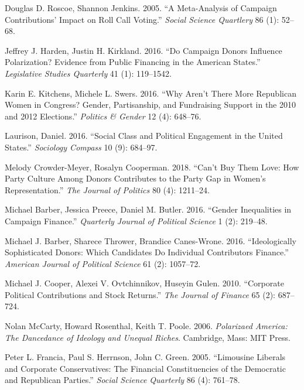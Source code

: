 \documentclass[11pt,]{article}
\begin{document}
\leavevmode\hypertarget{ref-roscoe2005}{}%
Douglas D. Roscoe, Shannon Jenkins. 2005. ``A Meta-Analysis of Campaign
Contributions' Impact on Roll Call Voting.'' \emph{Social Science
Quartlery} 86 (1): 52--68.

\leavevmode\hypertarget{ref-harden2016}{}%
Jeffrey J. Harden, Justin H. Kirkland. 2016. ``Do Campaign Donors
Influence Polarization? Evidence from Public Financing in the American
States.'' \emph{Legislative Studies Quarterly} 41 (1): 119--1542.

\leavevmode\hypertarget{ref-kitchens2016}{}%
Karin E. Kitchens, Michele L. Swers. 2016. ``Why Aren't There More
Republican Women in Congress? Gender, Partisanship, and Fundraising
Support in the 2010 and 2012 Elections.'' \emph{Politics \& Gender} 12
(4): 648--76.

\leavevmode\hypertarget{ref-laurison2016}{}%
Laurison, Daniel. 2016. ``Social Class and Political Engagement in the
United States.'' \emph{Sociology Compass} 10 (9): 684--97.

\leavevmode\hypertarget{ref-crowder-meyer2018}{}%
Melody Crowder-Meyer, Rosalyn Cooperman. 2018. ``Can't Buy Them Love:
How Party Culture Among Donors Contributes to the Party Gap in Women's
Representation.'' \emph{The Journal of Politics} 80 (4): 1211--24.

\leavevmode\hypertarget{ref-barber2016b}{}%
Michael Barber, Jessica Preece, Daniel M. Butler. 2016. ``Gender
Inequalities in Campaign Finance.'' \emph{Quarterly Journal of Political
Science} 1 (2): 219--48.

\leavevmode\hypertarget{ref-barber2016c}{}%
Michael J. Barber, Sharece Thrower, Brandice Canes-Wrone. 2016.
``Ideologically Sophisticated Donors: Which Candidates Do Individual
Contributors Finance.'' \emph{American Journal of Political Science} 61
(2): 1057--72.

\leavevmode\hypertarget{ref-cooper2010}{}%
Michael J. Cooper, Alexei V. Ovtchinnikov, Huseyin Gulen. 2010.
``Corporate Political Contributions and Stock Returns.'' \emph{The
Journal of Finance} 65 (2): 687--724.

\leavevmode\hypertarget{ref-mccarty2006}{}%
Nolan McCarty, Howard Rosenthal, Keith T. Poole. 2006. \emph{Polarizaed
America: The Dancedance of Ideology and Unequal Riches}. Cambridge,
Mass: MIT Press.

\leavevmode\hypertarget{ref-francia2005}{}%
Peter L. Francia, Paul S. Herrnson, John C. Green. 2005. ``Limousine
Liberals and Corporate Conservatives: The Financial Constituencies of
the Democratic and Republican Parties.'' \emph{Social Science Quarterly}
86 (4): 761--78.
\end{document}
